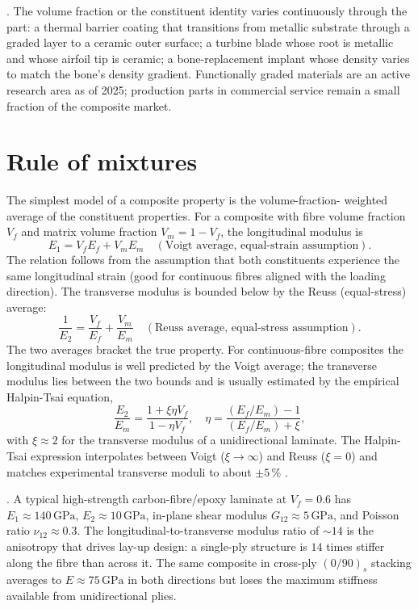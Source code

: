 . The volume fraction or the
constituent identity varies continuously through the part: a thermal
barrier coating that transitions from metallic substrate through a
graded layer to a ceramic outer surface; a turbine blade whose root is
metallic and whose airfoil tip is ceramic; a bone-replacement implant
whose density varies to match the bone's density gradient. Functionally
graded materials are an active research area as of 2025; production
parts in commercial service remain a small fraction of the composite
market.

\section{Rule of mixtures}

The simplest model of a composite property is the volume-fraction-
weighted average of the constituent properties. For a composite with
fibre volume fraction $V_f$ and matrix volume fraction $V_m = 1 - V_f$,
the longitudinal modulus is
\[
E_1 = V_f E_f + V_m E_m \quad (\text{Voigt average, equal-strain
assumption}).
\]
The relation follows from the assumption that both constituents
experience the same longitudinal strain (good for continuous fibres
aligned with the loading direction). The transverse modulus is bounded
below by the Reuss (equal-stress) average:
\[
\frac{1}{E_2} = \frac{V_f}{E_f} + \frac{V_m}{E_m} \quad
(\text{Reuss average, equal-stress assumption}).
\]
The two averages bracket the true property. For continuous-fibre
composites the longitudinal modulus is well predicted by the Voigt
average; the transverse modulus lies between the two bounds and is
usually estimated by the empirical Halpin-Tsai equation,
\[
\frac{E_2}{E_m} = \frac{1 + \xi \eta V_f}{1 - \eta V_f}, \quad
\eta = \frac{(E_f/E_m) - 1}{(E_f/E_m) + \xi},
\]
with $\xi \approx 2$ for the transverse modulus of a unidirectional
laminate. The Halpin-Tsai expression interpolates between Voigt
($\xi \to \infty$) and Reuss ($\xi = 0$) and matches experimental
transverse moduli to about $\pm 5\,\%$ \cite[ch.~6]{
text:chawla-composites}.

. A typical
high-strength carbon-fibre/epoxy laminate at $V_f = 0.6$ has
$E_1 \approx 140\,\text{GPa}$, $E_2 \approx 10\,\text{GPa}$, in-plane
shear modulus $G_{12} \approx 5\,\text{GPa}$, and Poisson ratio $\nu_{12}
\approx 0.3$. The longitudinal-to-transverse modulus ratio of $\sim 14$
is the anisotropy that drives lay-up design: a single-ply structure is
$14$ times stiffer along the fibre than across it. The same composite
in cross-ply $(0/90)_s$ stacking averages to $E \approx 75\,\text{GPa}$
in both directions but loses the maximum stiffness available from
unidirectional plies.

